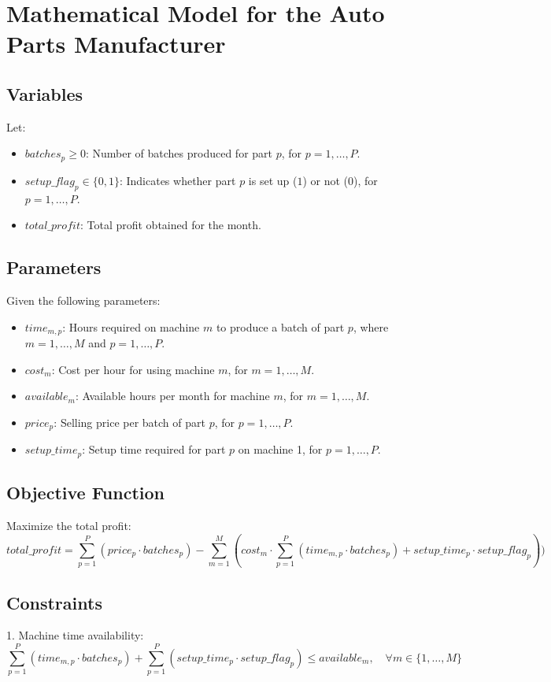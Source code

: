 \documentclass{article}
\begin{document}
\section*{Mathematical Model for the Auto Parts Manufacturer}

\subsection*{Variables}
Let:
\begin{itemize}
    \item $batches_{p} \geq 0$: Number of batches produced for part $p$, for $p = 1, \ldots, P$.
    \item $setup\_flag_{p} \in \{0, 1\}$: Indicates whether part $p$ is set up ($1$) or not ($0$), for $p = 1, \ldots, P$.
    \item $total\_profit$: Total profit obtained for the month.
\end{itemize}

\subsection*{Parameters}
Given the following parameters:
\begin{itemize}
    \item $time_{m,p}$: Hours required on machine $m$ to produce a batch of part $p$, where $m = 1, \ldots, M$ and $p = 1, \ldots, P$.
    \item $cost_{m}$: Cost per hour for using machine $m$, for $m = 1, \ldots, M$.
    \item $available_{m}$: Available hours per month for machine $m$, for $m = 1, \ldots, M$.
    \item $price_{p}$: Selling price per batch of part $p$, for $p = 1, \ldots, P$.
    \item $setup\_time_{p}$: Setup time required for part $p$ on machine 1, for $p = 1, \ldots, P$.
\end{itemize}

\subsection*{Objective Function}
Maximize the total profit:
\[
total\_profit = \sum_{p=1}^{P} (price_{p} \cdot batches_{p}) - \sum_{m=1}^{M} (cost_{m} \cdot \sum_{p=1}^{P} (time_{m,p} \cdot batches_{p}) + setup\_time_{p} \cdot setup\_flag_{p}))
\]

\subsection*{Constraints}
1. Machine time availability:
\[
\sum_{p=1}^{P} (time_{m,p} \cdot batches_{p}) + \sum_{p=1}^{P} (setup\_time_{p} \cdot setup\_flag_{p}) \leq available_{m}, \quad \forall m \in \{1, \ldots, M\}
\]
\end{document}
